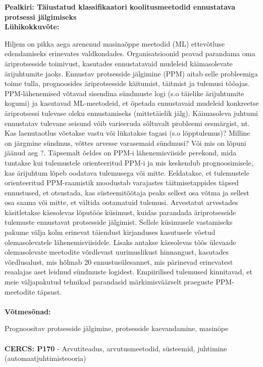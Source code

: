 \begin{abstracts}
{  \bfseries \Large {Pealkiri: }\large Täiustatud klassifikaatori koolitusmeetodid ennustatava protsessi jälgimiseks}\\[0.5cm]

{\Large \bfseries L\"{u}hikokkuv\~{o}te:}

Hiljem on pikka aega arenenud masina\~{o}ppe meetodid (ML) ettev\~{o}tluse edendamiseks erinevates valdkondades. Organisatsioonid peavad parandama oma \"{a}riprotsesside toimivust, kasutades ennustatavaid mudeleid käimasolevate \"{a}rijuhtumite jaoks. Ennustav protsesside j\"{a}lgimine (PPM) aitab selle probleemiga toime tulla, prognoosides \"{a}riprotsesside k\"{a}itumist, t\"{a}itmist ja tulemusi t\~{o}\~{o}ajas. PPM-l\"{a}henemised v\~{o}tavad sisendina sündmuste logi (s.o t\"{a}ielike \"{a}rijuhtumite kogumi) ja kasutavad ML-meetodeid, et \~{o}petada ennustavaid mudeleid konkreetse \"{a}riprotsessi tulevase oleku ennustamiseks (mittetäielik j\"{a}lg). K\"{a}imasoleva juhtumi ennustatav tulevane seisund v\~{o}ib varieeruda s\~{o}ltuvalt probleemi eesm\"{a}rgist, nt. Kas laenutaotlus v\~{o}etakse vastu v\~{o}i l\"{u}katakse tagasi (s.o l\~{o}pptulemus)? Milline on j\"{a}rgmine s\"{u}ndmus, v\~{o}ttes arvesse varasemaid s\"{u}ndmusi? V\~{o}i mis on l\~{o}puni j\"{a}\"{a}nud aeg ?. T\"{a}psemalt \~{o}eldes on PPM-i l\"{a}henemisviiside perekond, mida tuntakse kui tulemustele orienteeritud PPM-i ja mis keskendub prognoosimisele, kas \"{a}rijuhtum l\~{o}peb oodatava tulemusega v\~{o}i mitte. Eeldatakse, et tulemustele orienteeritud PPM-raamistik moodustab varajastes t\"{a}itmisetappides t\"{a}psed ennustused, et otsustada, kas s\"{u}steemit\~{o}\~{o}taja peaks sellest osa v\~{o}tma ja sellest osa saama v\~{o}i mitte, et v\"{a}ltida ootamatuid tulemusi. Arvestatut arvestades k\"{a}sitletakse k\"{a}esolevas l\~{o}putöös k\"{u}simust, kuidas parandada \"{a}riprotsesside tulemuste ennustavat protsesside j\"{a}lgimist. Sellele k\"{u}simusele vastamiseks pakume v\"{a}lja kolm erinevat t\"{a}iendust kirjanduses kasutusele v\~{o}etud olemasolevatele l\"{a}henemisviisidele. Lisaks antakse k\"{a}esolevas t\~{o}\~{o}s \"{u}levaade olemasolevate meetodite v\~{o}rdlevast uurimuslikust hinnangust, kasutades v\~{o}rdlusalust, mis h\~{o}lmab 20 ennustusülesannet, mis p\"{a}rinevad erinevatest reaalajas aset leidnud s\"{u}ndmuste logidest. Empiirilised tulemused kinnitavad, et meie v\"{a}ljapakutud tehnikad parandasid m\"{a}rkimisv\"{a}\"{a}rselt praeguste PPM-meetodite t\"{a}psust.
\\
\\
{\Large \bfseries V\~{o}tmes\~{o}nad:}

Prognoositav protsesside j\"{a}lgimine, protsesside kaevandamine, masin\"{o}pe
\\
\\
{\large \bfseries CERCS: P170}  - Arvutiteadus, arvutusmeetodid, s\"{u}steemid, juhtimine (automaatjuhtimisteooria)




\end{abstracts}

\let\cleardoublepage\clearpage
